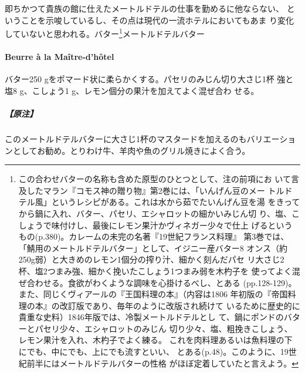 \begin{recette}
{{{{  即ちかつて貴族の館に仕えたメートルドテルの仕事を勤めるに他ならない、
  ということを示唆しているし、その点は現代の一流ホテルにおいてもあま
  り変化していないと思われる。}バター\footnote{この合わせバターの名称も含めた原型のひとつとして、注の前項にお
  いて言及したマラン『コモス神の贈り物』第2巻には、「いんげん豆のメー
  トルドテル風」というレシピがある。これは水から茹でたいんげん豆を湯
  をきってから鍋に入れ、バター、パセリ、エシャロットの細かいみじん切
  り、塩、こしょうで味付けし、最後にレモン果汁かヴィネガー少々で仕上
  げるというもの(p.380)。カレームの未完の名著『19世紀フランス料理』
  第3巻では、「鯖用のメートルドテルバター」として、イジニー産バター8
  オンス（約250g弱）と大きめのレモン1個分の搾り汁、細かく刻んだパセ
  リ大さじ2杯、塩2つまみ強、細かく挽いたこしょう1つまみ弱を木杓子を
  使ってよく混ぜ合わせる。食欲がわくような調味を心掛けるべし、とある
  (pp.128-129)。また、同じくヴィアールの『王国料理の本』（内容は1806
  年初版の『帝国料理の本』の改訂版であり、毎年のように改版され続けて
  いるために歴史的に貴重な史料）1846年版では、冷製メートルドテルとし
  て、鍋に\unquart{}ポンドのバターとパセリ少々、エシャロットのみじん
  切り少々、塩、粗挽きこしょう、レモン果汁を入れ、木杓子でよく練る。
  これを肉料理あるいは魚料理の下にでも、中にでも、上にでも流すといい、
  とある(p.48)。このように、19世紀前半にはメートルドテルバターの性格
  がほぼ定着していたと言えよう。}}{メートルドテルバター}}\label{ux30e1ux30fcux30c8ux30ebux30c9ux30c6ux30eb25ux30d0ux30bfux30fc26}}

\hypertarget{beurre-a-la-maitre-d-hotel}{%
\paragraph{Beurre à la
Maître-d'hôtel}\label{beurre-a-la-maitre-d-hotel}}


バター250 gをポマード状に柔らかくする。パセリのみじん切り大さじ1杯
強と塩8 g、こしょう1 g、レモン\unquart{}個分の果汁を加えてよく混ぜ合わ
せる。

\hypertarget{ux539fux6ce8-2}{%
\subparagraph{【原注】}\label{ux539fux6ce8-2}}

このメートルドテルバターに大さじ1杯のマスタードを加えるのもバリエーショ
ンとしてお勧め。とりわけ牛、羊肉や魚のグリル焼きによく合う。


\end{recette}
